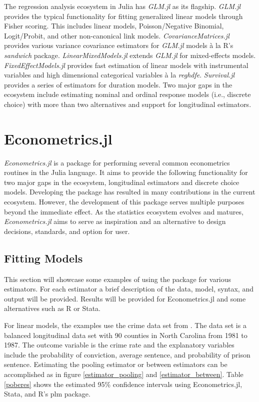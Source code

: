 \documentclass{juliacon}
\begin{document}
The regression analysis ecosystem in Julia has \textit{GLM.jl} as its flagship. \textit{GLM.jl} provides the typical functionality for fitting generalized linear models through Fisher scoring. This includes linear models, Poisson/Negative Binomial, Logit/Probit, and other non-canonical link models. \textit{CovarianceMatrices.jl} provides various variance covariance estimators for \textit{GLM.jl} models à la R's \textit{sandwich} package. \textit{LinearMixedModels.jl} \cite{LinearMixedModels} extends \textit{GLM.jl} for mixed-effects models. \textit{FixedEffectModels.jl} provides fast estimation of linear models with instrumental variables and high dimensional categorical variables à la \textit{reghdfe}. \textit{Survival.jl} provides a series of estimators for duration models. Two major gaps in the ecosystem include estimating nominal and ordinal response models (i.e., discrete choice) with more than two alternatives and support for longitudinal estimators.

\section{Econometrics.jl}

\textit{Econometrics.jl} is a package for performing several common econometrics routines in the Julia language. It aims to provide the following functionality for two major gaps in the ecosystem, longitudinal estimators and discrete choice models. Developing the package has resulted in many contributions in the current ecosystem. However, the development of this package serves multiple purposes beyond the immediate effect. As the statistics ecosystem evolves and matures, \textit{Econometrics.jl} aims to serve as inspiration and an alternative to design decisions, standards, and option for user.

\subsection{Fitting Models}

This section will showcase some examples of using the package for various estimators. For each estimator a brief description of the data, model, syntax, and output will be provided. Results will be provided for Econometrics.jl and some alternatives such as R or Stata.

For linear models, the examples use the crime data set from \cite{Crime}. The data set is a balanced longitudinal data set with 90 counties in North Carolina from 1981 to 1987. The outcome variable is the crime rate and the explanatory variables include the probability of conviction, average sentence, and probability of prison sentence. Estimating the pooling estimator or between estimators can be accomplished as in figure \vref{estimator_pooling} and \vref{estimator_between}. Table \vref{poberes} shows the estimated 95\% confidence intervals using Econometrics.jl, Stata, and R's plm package.
\end{document}
